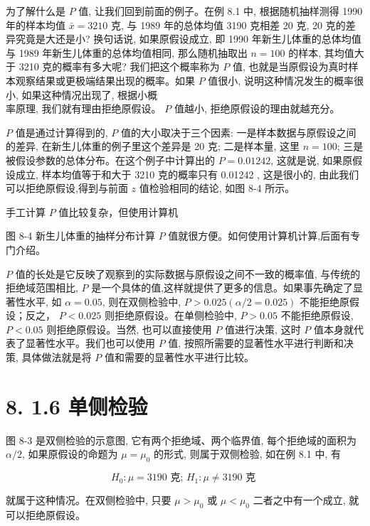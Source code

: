 \documentclass[10pt]{article}
\begin{document}
\begin{CJK*}{UTF8}{bsmi}
为了解什么是 $P$ 值, 让我们回到前面的例子。在例 8.1 中, 根据随机抽样测得 1990 年的样本均值 $\bar{x}=3210$ 克, 与 1989 年的总体均值 3190 克相差 20 克, 20 克的差异究竟是大还是小? 换句话说, 如果原假设成立, 即 1990 年新生儿体重的总体均值与 1989 年新生儿体重的总体均值相同, 那么随机抽取出 $n=100$ 的样本, 其均值大于 3210 克的概率有多大呢? 我们把这个概率称为 $P$ 值, 也就是当原假设为真时样本观察结果或更极端结果出现的概率。如果 $P$ 值很小, 说明这种情况发生的概率很小, 如果这种情况出现了, 根据小概\\
率原理, 我们就有理由拒绝原假设。 $P$ 值越小, 拒绝原假设的理由就越充分。

$P$ 值是通过计算得到的, $P$ 值的大小取决于三个因素: 一是样本数据与原假设之间的差异, 在新生儿体重的例子里这个差异是 20 克; 二是样本量, 这里 $n=100$; 三是被假设参数的总体分布。在这个例子中计算出的 $P=0.01242$, 这就是说, 如果原假设成立, 样本均值等于和大于 3210 克的概率只有 0.01242 , 这是很小的, 由此我们可以拒绝原假设,得到与前面 $z$ 值检验相同的结论, 如图 8-4 所示。

手工计算 $P$ 值比较复杂，但使用计算机

\begin{center}
\end{center}

图 8-4 新生儿体重的抽样分布计算 $P$ 值就很方便。如何使用计算机计算,后面有专门介绍。

$P$ 值的长处是它反映了观察到的实际数据与原假设之间不一致的概率值, 与传统的拒绝域范围相比, $P$ 是一个具体的值,这样就提供了更多的信息。如果事先确定了显著性水平, 如 $\alpha=0.05$, 则在双侧检验中, $P>0.025(\alpha / 2=0.025)$ 不能拒绝原假设；反之， $P<0.025$ 则拒绝原假设。在单侧检验中, $P>0.05$ 不能拒绝原假设, $P<0.05$ 则拒绝原假设。当然, 也可以直接使用 $P$ 值进行决策, 这时 $P$ 值本身就代表了显著性水平。我们也可以使用 $P$ 值, 按照所需要的显著性水平进行判断和决策, 具体做法就是将 $P$ 值和需要的显著性水平进行比较。

\section*{8. 1.6 单侧检验}
图 8-3 是双侧检验的示意图, 它有两个拒绝域、两个临界值, 每个拒绝域的面积为 $\alpha / 2$, 如果原假设的命题为 $\mu=\mu_{0}$ 的形式, 则属于双侧检验, 如在例 8.1 中, 有

$$
H_{0}: \mu=3190 \text { 克; } H_{1}: \mu \neq 3190 \text { 克 }
$$

就属于这种情况。在双侧检验中, 只要 $\mu>\mu_{0}$ 或 $\mu<\mu_{0}$ 二者之中有一个成立, 就可以拒绝原假设。


\end{CJK*}
\end{document}
